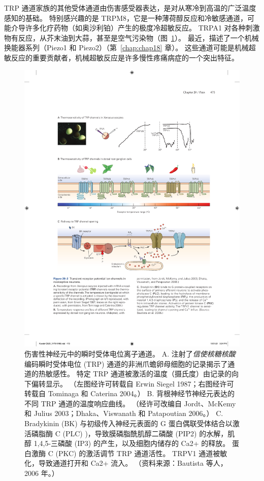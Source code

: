TRP 通道家族的其他受体通道由伤害感受器表达，是对从寒冷到高温的广泛温度感知的基础。
特别感兴趣的是 TRPM8，它是一种薄荷醇反应和冷敏感通道，可能介导许多化疗药物（如奥沙利铂）产生的极度冷超敏反应。
TRPA1 对各种刺激物有反应，从芥末油到大蒜，甚至是空气污染物（图~\ref{fig:20_2}）。
最近，描述了一个机械换能器系列（Piezo1 和 Piezo2）（第~\ref{chap:chap18} 章）。
这些通道可能是机械超敏反应的重要贡献者，机械超敏反应是许多慢性疼痛病症的一个突出特征。


\begin{figure}[htbp]
	\centering
	\includegraphics[width=0.7\linewidth]{chap20/fig_20_2}
	\caption{伤害性神经元中的瞬时受体电位离子通道。
		A. 注射了\textit{信使核糖核酸}编码瞬时受体电位 (TRP) 通道的非洲爪蟾卵母细胞的记录揭示了通道的热敏感性。
		特定 TRP 通道被激活的温度（摄氏度）由记录的向下偏转显示。 （左图经许可转载自 Erwin Siegel 1987；右图经许可转载自 Tominaga 和 Caterina 2004。）
		B. 背根神经节神经元表达的不同 TRP 通道的温度响应曲线。 （经许可改编自 Jordt、McKemy 和 Julius 2003；Dhaka、Viswanath 和 Patapoutian 2006。）
		C. Bradykinin (BK) 与初级传入神经元表面的 G 蛋白偶联受体结合以激活磷脂酶 C (PLC) )，导致膜磷脂酰肌醇二磷酸 (PIP2) 的水解，肌醇 1,4,5-三磷酸 (IP3) 的产生，以及细胞内储存的 Ca2+ 的释放。
		蛋白激酶 C (PKC) 的激活调节 TRP 通道活性。 
		TRPV1 通道被敏化，导致通道打开和 Ca2+ 流入。 （资料来源：Bautista 等人，2006 年。）}
	\label{fig:20_2}
\end{figure}


